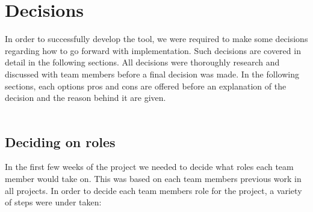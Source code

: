\documentclass{l3proj}
\begin{document}
\section{Decisions}

In order to successfully develop the tool, we were required to make some decisions regarding how to go forward with implementation. Such decisions are covered in detail in the following sections. All decisions were thoroughly research and discussed with team members before a final decision was made. In the following sections, each options pros and cons are offered before an explanation of the decision and the reason behind it are given.\\
\\ 

\subsection{Deciding on roles}
In the first few weeks of the project we needed to decide what roles each team member would take on.  This was based on each team members previous work in all projects. In order to decide each team members role for the project, a variety of steps were under taken:
\end{document}
